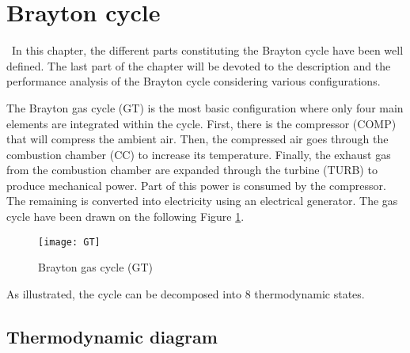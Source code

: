 \section{Brayton cycle}
\quad\, In this chapter, the different parts constituting the Brayton cycle have been well defined. The last part of the chapter will be devoted to the description and the performance analysis of the Brayton cycle considering various configurations.

The Brayton gas cycle (GT) is the most basic configuration where only four main elements are integrated within the cycle. First, there is the compressor (COMP) that will compress the ambient air. Then, the compressed air goes through the combustion chamber (CC) to increase its temperature. Finally, the exhaust gas from the combustion chamber are expanded through the turbine (TURB) to produce mechanical power. Part of this power is consumed by the compressor. The remaining is converted into electricity using an electrical generator. The gas cycle have been drawn on the following Figure \ref{fig:C3_BraytonGT}.

\begin{figure}[h]
\centering
\texttt{[image: GT]}
\caption{Brayton gas cycle (GT)}
\label{fig:C3_BraytonGT}
\end{figure}

As illustrated, the cycle can be decomposed into 8 thermodynamic states.



\subsection{Thermodynamic diagram}
